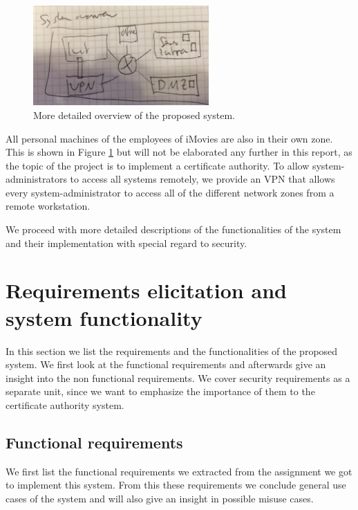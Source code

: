\documentclass[a4paper, toc=index, 12pt, DIV14, twoside, BCOR2cm, headsepline, numbers=noenddot, bibliography=totoc]{scrbook}
\begin{document}
\begin{figure}[H]
  \centering
    \includegraphics[width=0.6\textwidth]{images/systemoverview.jpg}  
  \caption{More detailed overview of the proposed system.}
  \label{systemoverview}
\end{figure}

All personal machines of the employees of iMovies are also in their own zone. This is shown in Figure \ref{systemoverview} but will not be elaborated any further in this report, as the topic of the project is to implement a certificate authority.\newline
To allow system-administrators to access all systems remotely, we provide an VPN that allows every system-administrator to access all of the different network zones from a remote workstation.

We proceed with more detailed descriptions of the functionalities of the system and their implementation with special regard to security.

\section{Requirements elicitation and system functionality}
In this section we list the requirements and the functionalities of the proposed system. We first look at the functional requirements and afterwards give an insight into the non functional requirements. We cover security requirements as a separate unit, since we want to emphasize the importance of them to the certificate authority system.

\subsection{Functional requirements}
We first list the functional requirements we extracted from the assignment we got to implement this system. From this these requirements we conclude general use cases of the system and will also give an insight in possible misuse cases.
\end{document}
